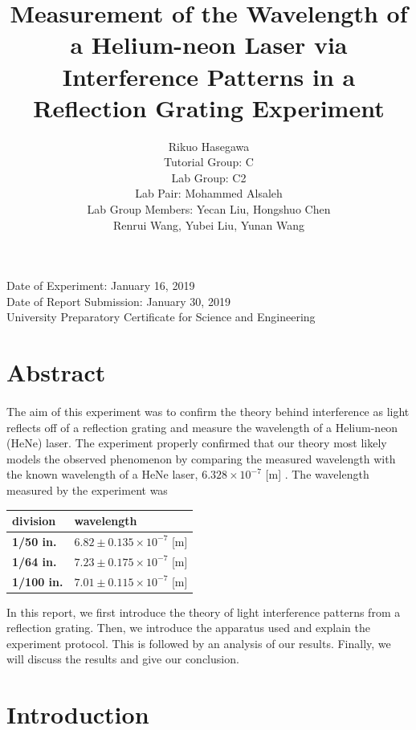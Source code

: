 \documentclass{article}
\title{Measurement of the Wavelength of a Helium-neon Laser via Interference Patterns in a Reflection Grating Experiment}
\author{ Rikuo Hasegawa
  \\ Tutorial Group: C
  \\ Lab Group: C2
  \\ Lab Pair: Mohammed Alsaleh
  \\ Lab Group Members: Yecan Liu, Hongshuo Chen \\ Renrui Wang, Yubei Liu, Yunan Wang }
\begin{document}
\maketitle
\thispagestyle{fancy}
\vspace*{\fill}
\parbox{\linewidth}{\centering%
Date of Experiment: January 16, 2019
\\ Date of Report Submission: January 30, 2019
\\ University Preparatory Certificate for Science and Engineering
}
\newpage

\section*{Abstract}
\paragraph{}
The aim of this experiment was to confirm the theory behind interference as light reflects off of a reflection grating and measure the wavelength of a Helium-neon (HeNe) laser. The experiment properly confirmed that our theory most likely models the observed phenomenon by comparing the measured wavelength with the known wavelength of a HeNe laser, $6.328 \times 10^{-7}$ [m] \autocite{WikiHeNe}. The wavelength measured by the experiment was

\begin{table}[H]
\begin{tabular}{|l|l|}
\hline
\textbf{division}  & \textbf{wavelength}                 \\ \hline
\textbf{1/50 in.}  & $6.82 \pm 0.135 \times 10^{-7}$ [m] \\ \hline
\textbf{1/64 in.}  & $7.23 \pm 0.175 \times 10^{-7}$ [m] \\ \hline
\textbf{1/100 in.} & $7.01 \pm 0.115 \times 10^{-7}$ [m] \\ \hline
\end{tabular}
\end{table}

In this report, we first introduce the theory of light interference patterns from a reflection grating. Then, we introduce the apparatus used and explain the experiment protocol. This is followed by an analysis of our results. Finally, we will discuss the results and give our conclusion.

\section{Introduction}
\end{document}
